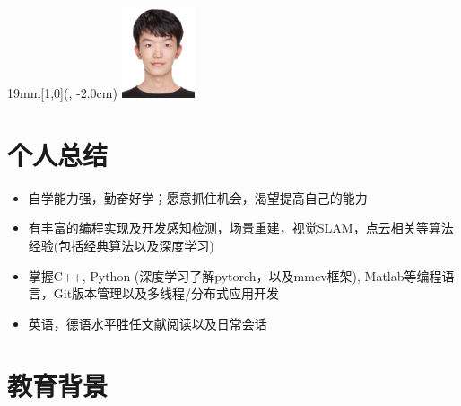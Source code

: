 \documentclass{resume}
\begin{document}


 
\newcommand{\UniversitaetLogoBreite}{19mm}
\newcommand{\SeitenrandOben}{1cm}
\begin{textblock*}{\UniversitaetLogoBreite}[1,0](\textwidth-10mm, -2.0cm)%
	\raggedleft\includegraphics[width=0.85in]{我的照片_裁剪.jpg}%
\end{textblock*}
 
\section{个人总结}
\begin{itemize}
\item {自学能力强，勤奋好学；愿意抓住机会，渴望提高自己的能力}
\item {有丰富的编程实现及开发感知检测，场景重建，视觉SLAM，点云相关等算法经验(包括经典算法以及深度学习)}
\item {掌握C++, Python (深度学习了解pytorch，以及mmcv框架), Matlab等编程语言，Git版本管理以及多线程/分布式应用开发}
\item {英语，德语水平胜任文献阅读以及日常会话}
\end{itemize}

\section{教育背景}
\end{document}
